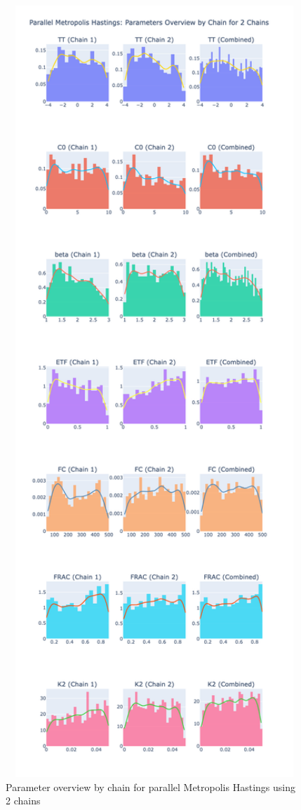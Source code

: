 \begin{figure}[H]
    \centering
    \includegraphics[width=1\textwidth]{figures/parallel_mh/param_overview_2.png}
    \captionsetup{width=.8\textwidth}
    \caption{Parameter overview by chain for parallel Metropolis Hastings using 2 chains}
    \label{fig:enter-label}
\end{figure}

